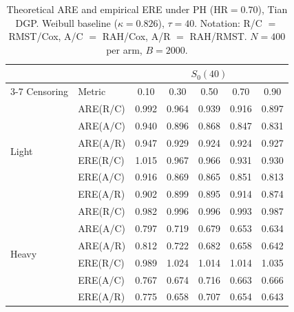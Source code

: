 \documentclass[12pt]{article}
\begin{document}
\begin{table}[ht]
\centering
\small
\caption{Theoretical ARE and empirical ERE under PH (HR$=0.70$), Tian DGP.
  Weibull baseline ($\kappa=0.826$), $\tau=40$.
  Notation: R/C $=$ RMST/Cox, A/C $=$ RAH/Cox, A/R $=$ RAH/RMST.
  $N=400$ per arm, $B=2000$.}
\label{tab:main-sim-ph-hr070-s0-010-090-light-heavy}
\setlength{\tabcolsep}{4pt}
\begin{tabular}{llccccc}
\hline
& & \multicolumn{5}{c}{$S_0(40)$} \\
\cline{3-7}
Censoring & Metric & 0.10 & 0.30 & 0.50 & 0.70 & 0.90 \\
\hline
  \multirow{6}{*}{Light} & ARE(R/C) & 0.992 & 0.964 & 0.939 & 0.916 & 0.897 \\
   & ARE(A/C) & 0.940 & 0.896 & 0.868 & 0.847 & 0.831 \\
   & ARE(A/R) & 0.947 & 0.929 & 0.924 & 0.924 & 0.927 \\
   & ERE(R/C) & 1.015 & 0.967 & 0.966 & 0.931 & 0.930 \\
   & ERE(A/C) & 0.916 & 0.869 & 0.865 & 0.851 & 0.813 \\
   & ERE(A/R) & 0.902 & 0.899 & 0.895 & 0.914 & 0.874 \\
\hline
  \multirow{6}{*}{Heavy} & ARE(R/C) & 0.982 & 0.996 & 0.996 & 0.993 & 0.987 \\
   & ARE(A/C) & 0.797 & 0.719 & 0.679 & 0.653 & 0.634 \\
   & ARE(A/R) & 0.812 & 0.722 & 0.682 & 0.658 & 0.642 \\
   & ERE(R/C) & 0.989 & 1.024 & 1.014 & 1.014 & 1.035 \\
   & ERE(A/C) & 0.767 & 0.674 & 0.716 & 0.663 & 0.666 \\
   & ERE(A/R) & 0.775 & 0.658 & 0.707 & 0.654 & 0.643 \\
\hline
\end{tabular}
\end{table}
\end{document}
